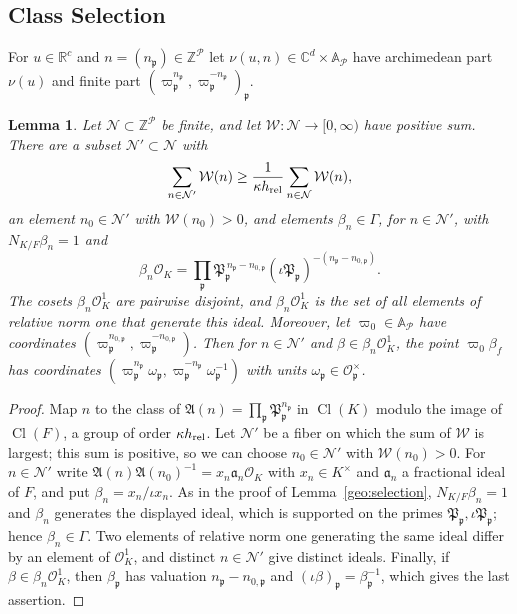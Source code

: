 \documentclass[11pt]{amsart}
\numberwithin{equation}{section}
\newtheorem{lemma}[equation]{Lemma}
\theoremstyle{definition}
\theoremstyle{remark}
\DeclareMathOperator{\Cl}{Cl}
\newcommand{\R}{\mathbb R}
\newcommand{\C}{\mathbb C}
\newcommand{\Z}{\mathbb Z}
\begin{document}
\subsection{Class Selection}

For $u\in\R^c$ and $n=(n_{\mathfrak p})\in\Z^{\mathcal P}$ let
$\nu(u,n)\in\C^d\times\mathbb A_{\mathcal P}$ have archimedean part
$\nu(u)$ and finite part $(\varpi_{\mathfrak p}^{n_{\mathfrak
p}},\varpi_{\mathfrak p}^{-n_{\mathfrak p}})_{\mathfrak p}$.

\begin{lemma}\label{fw:selection}
Let $\mathcal N\subset\Z^{\mathcal P}$ be finite, and let
$\mathcal W\colon\mathcal N\to[0,\infty)$ have positive sum. There are a
subset $\mathcal N'\subset\mathcal N$ with
\[
 \sum_{n\in\mathcal N'}\mathcal W(n)\ge\frac1{\kappa h_{\rm rel}}
 \sum_{n\in\mathcal N}\mathcal W(n),
\]
an element $n_0\in\mathcal N'$ with $\mathcal W(n_0)>0$, and elements
$\beta_n\in\Gamma$, for $n\in\mathcal N'$, with $N_{K/F}\beta_n=1$ and
\[
 \beta_n\mathcal O_K=\prod_{\mathfrak p}\mathfrak P_{\mathfrak
 p}^{\,n_{\mathfrak p}-n_{0,\mathfrak p}}
 (\iota\mathfrak P_{\mathfrak p})^{-(n_{\mathfrak p}-n_{0,\mathfrak p})}.
\]
The cosets $\beta_n\mathcal O_K^1$ are pairwise disjoint, and
$\beta_n\mathcal O_K^1$ is the set of all elements of relative norm one
that generate this ideal. Moreover, let $\varpi_0\in\mathbb A_{\mathcal
P}$ have coordinates $(\varpi_{\mathfrak p}^{n_{0,\mathfrak
p}},\varpi_{\mathfrak p}^{-n_{0,\mathfrak p}})$. Then for $n\in\mathcal
N'$ and $\beta\in\beta_n\mathcal O_K^1$, the point $\varpi_0\beta_f$ has
coordinates $(\varpi_{\mathfrak p}^{n_{\mathfrak p}}\omega_{\mathfrak
p},\varpi_{\mathfrak p}^{-n_{\mathfrak p}}\omega_{\mathfrak p}^{-1})$
with units $\omega_{\mathfrak p}\in\mathcal O_{\mathfrak p}^\times$.
\end{lemma}

\begin{proof}
Map $n$ to the class of $\mathfrak A(n)=\prod_{\mathfrak p}\mathfrak
P_{\mathfrak p}^{n_{\mathfrak p}}$ in $\Cl(K)$ modulo the image of
$\Cl(F)$, a group of order $\kappa h_{\rm rel}$. Let $\mathcal N'$ be a
fiber on which the sum of $\mathcal W$ is largest; this sum is positive,
so we can choose $n_0\in\mathcal N'$ with $\mathcal W(n_0)>0$. For
$n\in\mathcal N'$ write $\mathfrak A(n)\mathfrak
A(n_0)^{-1}=x_n\mathfrak a_n\mathcal O_K$ with $x_n\in K^\times$ and
$\mathfrak a_n$ a fractional ideal of $F$, and put
$\beta_n=x_n/\iota x_n$. As in the proof of Lemma~\ref{geo:selection},
$N_{K/F}\beta_n=1$ and $\beta_n$ generates the displayed ideal, which
is supported on the primes $\mathfrak P_{\mathfrak p},\iota\mathfrak
P_{\mathfrak p}$; hence $\beta_n\in\Gamma$. Two elements of relative
norm one generating the same ideal differ by an element of $\mathcal
O_K^1$, and distinct $n\in\mathcal N'$ give distinct ideals. Finally, if
$\beta\in\beta_n\mathcal O_K^1$, then $\beta_{\mathfrak p}$ has
valuation $n_{\mathfrak p}-n_{0,\mathfrak p}$ and $(\iota\beta)_{\mathfrak
p}=\beta_{\mathfrak p}^{-1}$, which gives the last assertion.
\end{proof}
\end{document}
